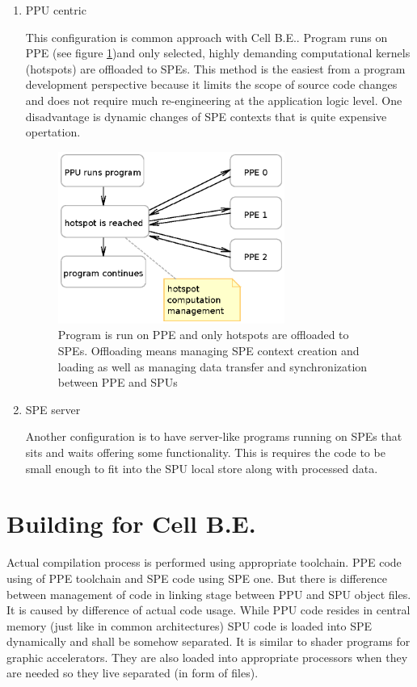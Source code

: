 \begin{enumerate}
\item PPU centric
\par
This configuration is common approach with Cell B.E..
Program runs on PPE (see figure \ref{fg:PPUCentricModel})and only selected, highly demanding computational kernels (hotspots) are offloaded to SPEs.
This method is the easiest from a program development perspective because it limits the scope of source code changes and does not require much re-engineering at the application logic level.
One disadvantage is dynamic changes of SPE contexts that is quite expensive opertation.

\begin{figure}
    \centering
    \includegraphics[width=0.7\textwidth]{data/PPUCentricModel}
    \caption[PPU centric configuration]{Program is run on PPE and only hotspots are offloaded to SPEs.
 Offloading means managing SPE context creation and loading as well as managing data transfer and synchronization between PPE and SPUs}
    \label{fg:PPUCentricModel}
\end{figure}

\item SPE server
\par
Another configuration is to have server-like programs running on SPEs that sits and waits offering some functionality.
 This is requires the code to be small enough to fit into the SPU local store along with processed data.

\end{enumerate}

\section {Building for Cell B.E.}
\par
Actual compilation process is performed using appropriate toolchain.
PPE code using of PPE toolchain and SPE code using SPE one.
But there is difference between management of code in linking stage between PPU and SPU object files.
It is caused by difference of actual code usage.
While PPU code resides in central memory (just like in common architectures) SPU code is loaded into SPE dynamically and shall be somehow separated.
It is similar to shader programs for graphic accelerators.
They are also loaded into appropriate processors when they are needed so they live separated (in form of files).

